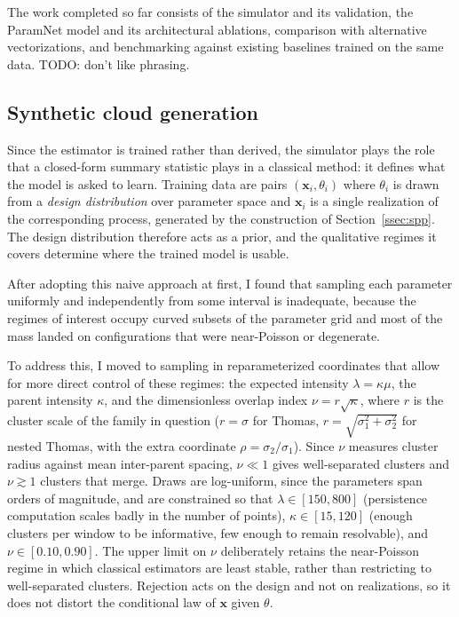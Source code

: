 \documentclass[11pt,a4paper]{article}
\newcommand{\pc}{\mathbf{x}}
\begin{document}
The work completed so far consists of the simulator and its validation, the
ParamNet model and its architectural ablations, comparison with alternative
vectorizations, and benchmarking against existing baselines trained on the same data. TODO: don't like phrasing.

\subsection{Synthetic cloud generation}
\label{ssec:simulator}

Since the estimator is trained rather than derived, the simulator plays the role
that a closed-form summary statistic plays in a classical method: it defines
what the model is asked to learn. Training data are pairs $(\pc_i, \theta_i)$
where $\theta_i$ is drawn from a \emph{design distribution} over parameter space
and $\pc_i$ is a single realization of the corresponding process, generated by
the construction of Section~\ref{ssec:spp}. The design distribution therefore
acts as a prior, and the qualitative regimes it covers determine where the
trained model is usable.

After adopting this naive approach at first, I found that sampling each parameter uniformly and independently from some interval is inadequate, because the regimes of interest occupy curved subsets of
the parameter grid and most of the mass landed on configurations that were
near-Poisson or degenerate. 

To address this, I moved to sampling in reparameterized coordinates that allow for more direct control of these regimes: the expected intensity
$\lambda = \kappa\mu$, the parent intensity $\kappa$, and the dimensionless
overlap index $\nu = r\sqrt{\kappa}$, where $r$ is the cluster scale of the
family in question ($r=\sigma$ for Thomas, $r=\sqrt{\sigma_1^2+\sigma_2^2}$ for nested Thomas, with the extra coordinate $\rho = \sigma_2/\sigma_1$). Since $\nu$ measures cluster radius against mean inter-parent spacing, $\nu \ll 1$ gives well-separated clusters and $\nu \gtrsim 1$ clusters that merge. Draws are log-uniform, since the parameters span orders of magnitude, and are constrained so that $\lambda \in [150,800]$ (persistence computation scales badly in the number of points), $\kappa \in [15,120]$ (enough clusters per window to be informative, few enough to remain resolvable), and $\nu \in [0.10,0.90]$. The upper limit on $\nu$ deliberately retains the near-Poisson regime in which classical estimators are least stable, rather than restricting to well-separated clusters. Rejection acts on the design and not on realizations, so it does not distort the conditional law of $\pc$ given $\theta$.
\end{document}
